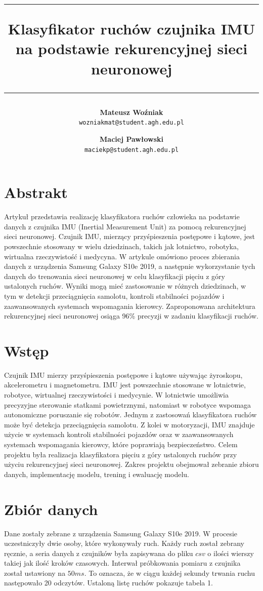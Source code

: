 \documentclass[10pt]{article}
\title{
\rule{\linewidth}{3pt}
Klasyfikator ruchów czujnika IMU na podstawie rekurencyjnej sieci neuronowej
\rule{\linewidth}{1pt}
}
\author{
  \textbf{Mateusz Woźniak}\\
  \texttt{wozniakmat@student.agh.edu.pl}
  \and
  \textbf{Maciej Pawłowski}\\
  \texttt{maciekp@student.agh.edu.pl}
}
\date{}
\begin{document}
\maketitle

\section*{Abstrakt}

Artykuł przedstawia realizację klasyfikatora ruchów człowieka na podstawie danych z czujnika IMU (Inertial Measurement Unit) za pomocą rekurencyjnej sieci neuronowej. Czujnik IMU, mierzący przyśpieszenia postępowe i kątowe, jest powszechnie stosowany w wielu dziedzinach, takich jak lotnictwo, robotyka, wirtualna rzeczywistość i medycyna. W artykule omówiono proces zbierania danych z urządzenia Samsung Galaxy S10e 2019, a następnie wykorzystanie tych danych do trenowania sieci neuronowej w celu klasyfikacji pięciu z góry ustalonych ruchów. Wyniki mogą mieć zastosowanie w różnych dziedzinach, w tym w detekcji przeciągnięcia samolotu, kontroli stabilności pojazdów i zaawansowanych systemach wspomagania kierowcy. Zaproponowana architektura rekurencyjnej sieci neuronowej osiąga 96\% precyzji w zadaniu klasyfikacji ruchów.

\section{Wstęp}

Czujnik IMU mierzy przyśpieszenia postępowe i kątowe używając żyroskopu, akcelerometru i magnetometru. 
IMU jest powszechnie stosowane w lotnictwie, robotyce, wirtualnej rzeczywistości i medycynie. W lotnictwie umożliwia precyzyjne sterowanie statkami powietrznymi, natomiast w robotyce wspomaga autonomiczne poruszanie się robotów. Jednym z zastosowań klasyfikatora ruchów może być detekcja przeciągnięcia samolotu. Z kolei w motoryzacji, IMU znajduje użycie w systemach kontroli stabilności pojazdów oraz w zaawansowanych systemach wspomagania kierowcy, które poprawiają bezpieczeństwo. Celem projektu była realizacja klasyfikatora pięciu z góry ustalonych ruchów przy użyciu rekurencyjnej sieci neuronowej. Zakres projektu obejmował zebranie zbioru danych, implementację modelu, trening i ewaluację modelu. 


\section{Zbiór danych}
Dane zostały zebrane z urządzenia Samsung Galaxy S10e 2019. W procesie uczestniczyły dwie osoby, które wykonywały ruch. Każdy ruch został zebrany ręcznie, a seria danych z czujników była zapisywana do pliku $csv$ o ilości wierszy takiej jak ilość kroków czasowych. Interwał próbkowania pomiaru z czujnika został ustawiony na $50ms$. To oznacza, że w ciągu każdej sekundy trwania ruchu następowało 20 odczytów. Ustaloną listę ruchów pokazuje tabela 1. 
\end{document}
